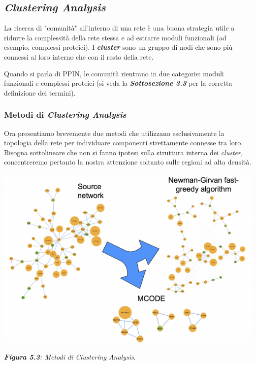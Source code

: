 \documentclass[11pt]{article}
\begin{document}
\subsection{\textit{Clustering Analysis}}
La ricerca di "comunità" all'interno di una rete è una buona strategia utile a ridurre la complessità della rete stessa e ad estrarre moduli funzionali (ad esempio, complessi proteici). I \textit{\textbf{cluster}} sono un gruppo di nodi che sono più connessi al loro interno che con il resto della rete. 

Quando si parla di PPIN, le comunità rientrano in due categorie: moduli funzionali e complessi proteici (si veda la \textit{\textbf{Sottosezione 3.3}} per la corretta definizione dei termini).

\subsubsection{Metodi di \textit{Clustering Analysis}}
Ora presentiamo brevemente due metodi che utilizzano esclusivamente la topologia della rete per individuare componenti strettamente connesse tra loro. Bisogna sottolineare che non si fanno ipotesi sulla struttura interna dei \textit{cluster}, concentreremo pertanto la nostra attenzione soltanto sulle regioni ad alta densità.

\begin{center}
\includegraphics[scale=0.55]{ng}

\begin{small}\textit{\textbf{Figura 5.3}: Metodi di Clustering Analysis}.\end{small}
\end{center}
\end{document}
